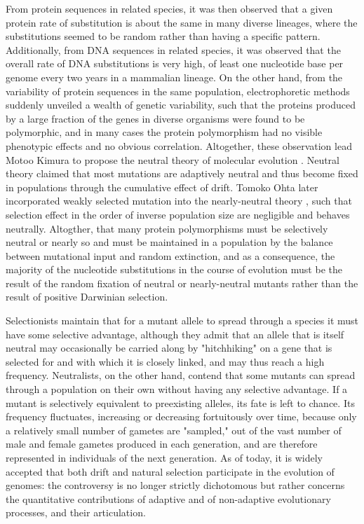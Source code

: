 From protein sequences in related species, it was then observed that a given protein rate of substitution is about the same in many diverse lineages, where the substitutions seemed to be random rather than having a specific pattern.
Additionally, from DNA sequences in related species, it was observed that the overall rate of DNA substitutions is very high, of least one nucleotide base per genome every two years in a mammalian lineage.
On the other hand, from the variability of protein sequences in the same population, electrophoretic methods suddenly unveiled a wealth of genetic variability, such that the proteins produced by a large fraction of the genes in diverse organisms were found to be polymorphic, and in many cases the protein polymorphism had no visible phenotypic effects and no obvious correlation.
Altogether, these observation lead Motoo Kimura to propose the \gls{neutral} theory of molecular evolution \citep{kimura1968evolutionary,kimura1991neutral,kimura1986dna}.
Neutral theory claimed that most mutations are adaptively \gls{neutral} and thus become fixed in populations through the cumulative effect of \gls{drift}.
Tomoko Ohta later incorporated weakly selected mutation into the \gls{nearly-neutral} theory \citep{ohta1973slightly}, such that selection effect in the order of inverse population size are negligible and behaves neutrally.
Altogther, that many protein polymorphisms must be selectively neutral or nearly so and must be maintained in a population by the balance between mutational input and random extinction, and as a consequence, the majority of the nucleotide substitutions in the course of evolution must be the result of the random fixation of neutral or nearly-neutral mutants rather than the result of positive Darwinian selection.

Selectionists maintain that for a mutant allele to spread through a species it must have some selective advantage, although they admit that an allele that is itself neutral may occasionally be carried along by "hitchhiking" on a gene that is selected for and with which it is closely linked, and may thus reach a high frequency.
Neutralists, on the other hand, contend that some mutants can spread through a population on their own without having any selective advantage. If a mutant is selectively equivalent to preexisting alleles, its fate is left to chance.
Its frequency fluctuates, increasing or decreasing fortuitously over time, because only a relatively small number of gametes are "sampled," out of the vast number of male and female gametes produced in each generation, and are therefore represented in individuals of the next generation.
As of today, it is widely accepted that both \gls{drift} and natural selection participate in the evolution of genomes: the controversy is no longer strictly dichotomous but rather concerns the quantitative contributions of adaptive and of non-adaptive evolutionary processes, and their articulation.

